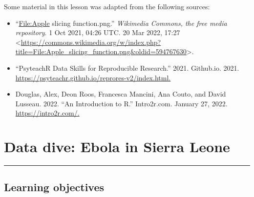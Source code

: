 \documentclass[
  letterpaper,
  DIV=11,
  numbers=noendperiod]{scrreprt}
\begin{document}
Some material in this lesson was adapted from the following sources:

\begin{itemize}
\item
  ``\url{File:Apple} slicing function.png.'' \emph{Wikimedia Commons,
  the free media repository}. 1 Oct 2021, 04:26 UTC. 20 Mar 2022, 17:27
  \textless{}\url{https://commons.wikimedia.org/w/index.php?title=File:Apple_slicing_function.png&oldid=594767630}\textgreater.
\item
  ``PsyteachR \textbar{} Data Skills for Reproducible Research.'' 2021.
  Github.io. 2021.
  \url{https://psyteachr.github.io/reprores-v2/index.html.}
\item
  Douglas, Alex, Deon Roos, Francesca Mancini, Ana Couto, and David
  Lusseau. 2022. ``An Introduction to R.'' Intro2r.com. January 27,
  2022. \url{https://intro2r.com/.}
\end{itemize}

\chapter{Data dive: Ebola in Sierra
Leone}\label{data-dive-ebola-in-sierra-leone}

\begin{center}\rule{0.5\linewidth}{0.5pt}\end{center}

\section*{Learning objectives}\label{learning-objectives-2}

\end{document}
